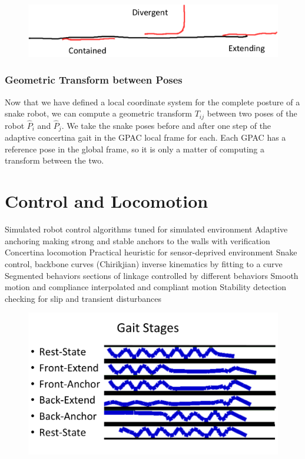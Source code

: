 \begin{figure}[htbp]
\centering
\includegraphics[keepaspectratio,width=\textwidth,height=0.75\textheight]{PastedGraphic4.pdf}
\label{pastedgraphic4.pdf}
\end{figure}



\subsection{Geometric Transform between Poses}
\label{sec:geo_transform}

Now that we have defined a local coordinate system for the complete posture of a snake robot, we can compute a geometric transform $T_{ij}$ between two poses of the robot $\hat{P}_i$ and $\hat{P}_j$. We take the snake poses before and after one step of the adaptive concertina gait in the GPAC local frame for each. Each GPAC has a reference pose in the global frame, so it is only a matter of computing a transform between the two.

\pagebreak 

\chapter{Control and Locomotion}
\label{controlandlocomotion}

Simulated robot control
algorithms tuned for simulated environment
Adaptive anchoring
making strong and stable anchors to the walls with verification
Concertina locomotion
Practical heuristic for sensor-deprived environment
Snake control, backbone curves (Chirikjian)
inverse kinematics by fitting to a curve
Segmented behaviors
sections of linkage controlled by different behaviors
Smooth motion and compliance
interpolated and compliant motion
Stability detection
checking for slip and transient disturbances

\begin{figure}[htbp]
\centering
\includegraphics[keepaspectratio,width=\textwidth,height=0.75\textheight]{PastedGraphic5.pdf}
\label{pastedgraphic5.pdf}
\end{figure}




